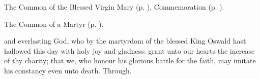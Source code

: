 \begin{rubric}
	The Common of the Blessed Virgin Mary (p. \pageref{CommonBVM}), Commemoration  (p. \pageref{Oswald}).
\end{rubric}


\clearpage
{}
\label{Oswald}

\begin{rubric}
	The Common of a Martyr (p. \pageref{CommonMartyr}).
\end{rubric}

{} and everlasting God, who by the martyrdom of the blessed King Oswald hast hallowed this day with holy joy and gladness: grant unto our hearts the increase of thy charity; that we, who honour his glorious battle for the faith, may imitate his constancy even unto death. Through.



